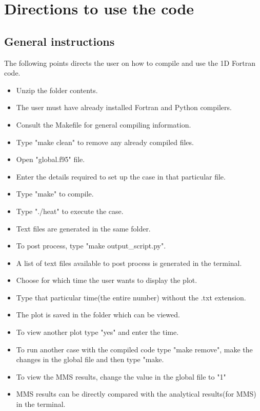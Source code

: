 \chapter{Directions to use the code}
\section{General instructions}
The following points directs the user on how to compile and use the 1D Fortran code.
\\

\begin{itemize}
  \item Unzip the folder contents.
  \item The user must have already installed Fortran and Python compilers.
  \item Consult the Makefile for general compiling information.
  \item Type "make clean" to remove any already compiled files.
  \item Open "global.f95" file.
  \item Enter the details required to set up the case in that particular file.
  \item Type "make" to compile.
  \item Type "./heat" to execute the case.
  \item Text files are generated in the same folder.
  \item To post process, type "make output\_script.py".
  \item A list of text files available to post process is generated in the terminal.
  \item Choose for which time the user wants to display the plot.
  \item Type that particular time(the entire number) without the .txt extension.
  \item The plot is saved in the folder which can be viewed.
  \item To view another plot type "yes" and enter the time.
  \item To run another case with the compiled code type "make remove", make the changes in the global file and then type "make.
  \item To view the MMS results, change the value in the global file to "1"
  \item MMS results can be directly compared with the analytical results(for MMS) in the terminal.
\end{itemize}

